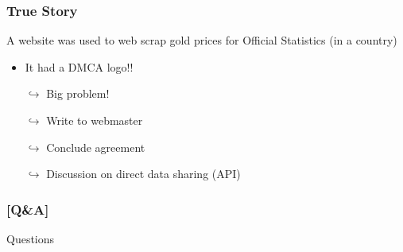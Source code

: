 \documentclass[xcolor=x11names,compress]{beamer}
\renewcommand{\(}{\begin{columns}}
\renewcommand{\)}{\end{columns}}
\newcommand{\<}[1]{\begin{column}{#1}}
\renewcommand{\>}{\end{column}}
\begin{document}
\begin{frame}
    \frametitle{True Story}
A website was used to web scrap gold prices for Official Statistics (in a country)
\pause
    \begin{itemize}[<+->]
        \item It had a DMCA logo!!
       \item[$\hookrightarrow$] Big problem!
       \item[$\hookrightarrow$] Write to webmaster
       \item[$\hookrightarrow$] Conclude agreement
       \item[$\hookrightarrow$] Discussion on direct data sharing (API)
    \end{itemize}
\end{frame}


\begin{frame} %
\frametitle{\textcolor{brique}{[Q\&A]}}
\begin{center}
\Large \textcolor{siap}{ Questions}
\end{center}
\end{frame}
\end{document}
